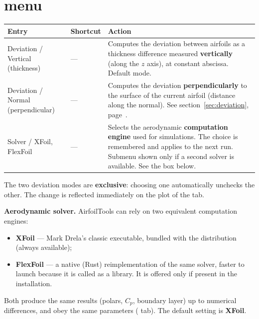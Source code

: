 \section{ menu}

\begin{tabularx}{\linewidth}{l l X}
    \toprule
    \textbf{Entry} & \textbf{Shortcut} & \textbf{Action} \\
    \midrule
    Deviation / Vertical (thickness)
        & ---
        & Computes the deviation between airfoils as a
          thickness difference measured \textbf{vertically} (along the $z$ axis),
          at constant abscissa. Default mode.\\
    Deviation / Normal (perpendicular)
        & ---
        & Computes the deviation \textbf{perpendicularly} to the
          surface of the current airfoil (distance along the normal).
          See section~\ref{sec:deviation},
          page~\pageref{sec:deviation}.\\
    Solver / XFoil, FlexFoil
        & ---
        & Selects the aerodynamic \textbf{computation engine} used for
          simulations. The choice is remembered and applies to the next
          run. Submenu shown only if a second solver is available. See
          the box below.\\
    \bottomrule
\end{tabularx}

\begin{noteinfo}
The two deviation modes are \textbf{exclusive}: choosing one
automatically unchecks the other. The change is reflected
immediately on the plot of the  tab.
\end{noteinfo}

\begin{noteinfo}
\textbf{Aerodynamic solver.} AirfoilTools can rely on two equivalent
computation engines:
\begin{itemize}
    \item \textbf{XFoil} --- Mark Drela's classic executable, bundled
        with the distribution (always available);
    \item \textbf{FlexFoil} --- a native (Rust) reimplementation of the
        same solver, faster to launch because it is called as a library.
        It is offered only if present in the installation.
\end{itemize}
Both produce the same results (polars, $C_p$, boundary layer) up to
numerical differences, and obey the same parameters ( tab). The default setting is \textbf{XFoil}.
\end{noteinfo}

